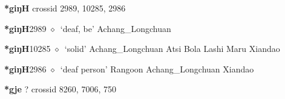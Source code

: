\item
\textbf{*giŋH}
  {\tiny crossid 2989, 10285, 2986}
  \begin{list}{}{\leftmargin=1.5em \itemindent=-1.5em}
  \item {\footnotesize \textbf{*giŋH}}{\tiny 2989}
         $\diamond$~`deaf, be'
         Achang\_Longchuan 
  \item {\footnotesize \textbf{*giŋH}}{\tiny 10285}
\hspace{1ex}
         $\diamond$~`solid'
         Achang\_Longchuan 
\hspace{1ex}
         Atsi 
\hspace{1ex}
         Bola 
\hspace{1ex}
         Lashi 
\hspace{1ex}
         Maru 
\hspace{1ex}
         Xiandao 
  \item {\footnotesize \textbf{*giŋH}}{\tiny 2986}
\hspace{1ex}
         $\diamond$~`deaf person'
         Rangoon 
\hspace{1ex}
         Achang\_Longchuan 
\hspace{1ex}
         Xiandao 
  \end{list}
\item
\textbf{*gje}
?
  {\tiny crossid 8260, 7006, 750}
